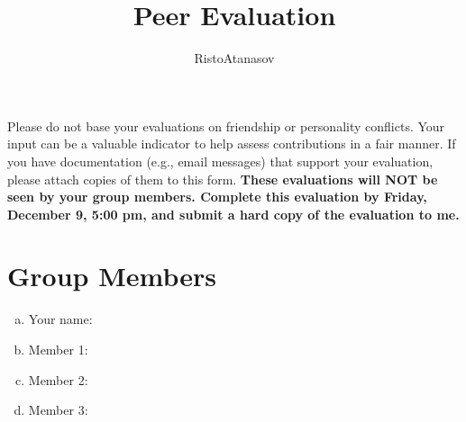 \documentclass[10pt, letterpaper]{article}
\author{RistoAtanasov}
\title{Peer Evaluation}
\begin{document}
\maketitle

Please do not base your evaluations on friendship or personality conflicts.
Your input can be a valuable indicator to help assess contributions in a
fair manner.  If you have documentation (e.g., email messages) that support
your evaluation, please attach copies of them to this form.  \textbf{These
evaluations will NOT be seen by your group members. Complete this
evaluation by Friday, December 9, 5:00 pm, and submit a hard copy of the
evaluation to me.}


\section{Group Members}
\begin{enumerate}[a.]
\item Your name: \hfill \underline{\hspace{5.25in}}\\
\item Member 1:  \hfill \underline{\hspace{5.25in}}\\
\item Member 2:  \hfill \underline{\hspace{5.25in}}\\
\item Member 3:  \hfill \underline{\hspace{5.25in}}\\
\end{enumerate}


\vspace{-0.75cm}
\end{document}
